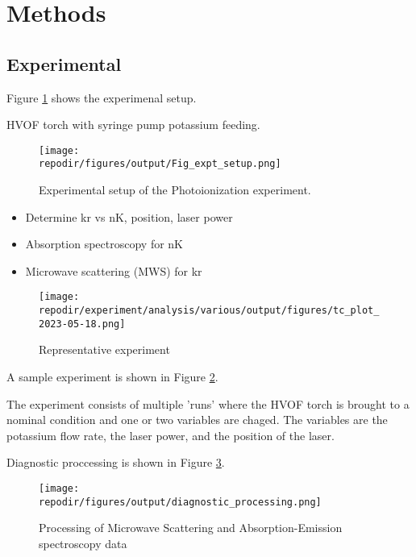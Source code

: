 \section{Methods}


\subsection{Experimental}

Figure \ref{fig:expt_setup} shows the experimenal setup. 

HVOF torch with syringe pump potassium feeding. 

\begin{figure}[h]
    \texttt{[image: \\repodir/figures/output/Fig\_expt\_setup.png]} 
    \caption{Experimental setup of the Photoionization experiment.}
    \label{fig:expt_setup}
\end{figure}

\begin{itemize}
\item Determine kr vs nK, position, laser power
\item Absorption spectroscopy for nK
\item Microwave scattering (MWS) for kr 
\end{itemize}


\begin{figure}[p]
    \texttt{[image: \\repodir/experiment/analysis/various/output/figures/tc\_plot\_2023-05-18.png]} 
    \caption{Representative experiment}
    \label{fig:expt_example}
\end{figure}

A sample experiment is shown in Figure \ref{fig:expt_example}.


The experiment consists of multiple 'runs' where the HVOF torch is brought to a nominal condition and one or two variables are chaged. The variables are the potassium flow rate, the laser power, and the position of the laser. 




Diagnostic proccessing is shown in Figure \ref{fig:diagnostic_processing}.

\begin{figure}[h]
    \texttt{[image: \\repodir/figures/output/diagnostic\_processing.png]} 
    \caption{Processing of Microwave Scattering and Absorption-Emission spectroscopy data}
    \label{fig:diagnostic_processing}
\end{figure}


